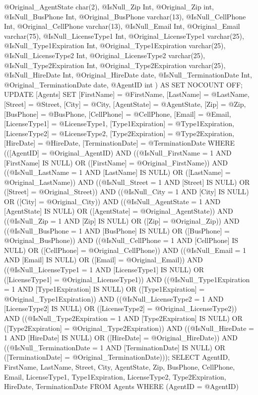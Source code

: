 	@Original_AgentState char(2),
	@IsNull_Zip Int,
	@Original_Zip int,
	@IsNull_BusPhone Int,
	@Original_BusPhone varchar(13),
	@IsNull_CellPhone Int,
	@Original_CellPhone varchar(13),
	@IsNull_Email Int,
	@Original_Email varchar(75),
	@IsNull_LicenseType1 Int,
	@Original_LicenseType1 varchar(25),
	@IsNull_Type1Expiration Int,
	@Original_Type1Expiration varchar(25),
	@IsNull_LicenseType2 Int,
	@Original_LicenseType2 varchar(25),
	@IsNull_Type2Expiration Int,
	@Original_Type2Expiration varchar(25),
	@IsNull_HireDate Int,
	@Original_HireDate date,
	@IsNull_TerminationDate Int,
	@Original_TerminationDate date,
	@AgentID int
) AS SET NOCOUNT OFF;
UPDATE [Agents] SET [FirstName] = @FirstName, [LastName] = @LastName, [Street] = @Street, [City] = @City, [AgentState] = @AgentState, [Zip] = @Zip, [BusPhone] = @BusPhone, [CellPhone] = @CellPhone, [Email] = @Email, [LicenseType1] = @LicenseType1, [Type1Expiration] = @Type1Expiration, [LicenseType2] = @LicenseType2, [Type2Expiration] = @Type2Expiration, [HireDate] = @HireDate, [TerminationDate] = @TerminationDate WHERE (([AgentID] = @Original_AgentID) AND ((@IsNull_FirstName = 1 AND [FirstName] IS NULL) OR ([FirstName] = @Original_FirstName)) AND ((@IsNull_LastName = 1 AND [LastName] IS NULL) OR ([LastName] = @Original_LastName)) AND ((@IsNull_Street = 1 AND [Street] IS NULL) OR ([Street] = @Original_Street)) AND ((@IsNull_City = 1 AND [City] IS NULL) OR ([City] = @Original_City)) AND ((@IsNull_AgentState = 1 AND [AgentState] IS NULL) OR ([AgentState] = @Original_AgentState)) AND ((@IsNull_Zip = 1 AND [Zip] IS NULL) OR ([Zip] = @Original_Zip)) AND ((@IsNull_BusPhone = 1 AND [BusPhone] IS NULL) OR ([BusPhone] = @Original_BusPhone)) AND ((@IsNull_CellPhone = 1 AND [CellPhone] IS NULL) OR ([CellPhone] = @Original_CellPhone)) AND ((@IsNull_Email = 1 AND [Email] IS NULL) OR ([Email] = @Original_Email)) AND ((@IsNull_LicenseType1 = 1 AND [LicenseType1] IS NULL) OR ([LicenseType1] = @Original_LicenseType1)) AND ((@IsNull_Type1Expiration = 1 AND [Type1Expiration] IS NULL) OR ([Type1Expiration] = @Original_Type1Expiration)) AND ((@IsNull_LicenseType2 = 1 AND [LicenseType2] IS NULL) OR ([LicenseType2] = @Original_LicenseType2)) AND ((@IsNull_Type2Expiration = 1 AND [Type2Expiration] IS NULL) OR ([Type2Expiration] = @Original_Type2Expiration)) AND ((@IsNull_HireDate = 1 AND [HireDate] IS NULL) OR ([HireDate] = @Original_HireDate)) AND ((@IsNull_TerminationDate = 1 AND [TerminationDate] IS NULL) OR ([TerminationDate] = @Original_TerminationDate)));
SELECT AgentID, FirstName, LastName, Street, City, AgentState, Zip, BusPhone, CellPhone, Email, LicenseType1, Type1Expiration, LicenseType2, Type2Expiration, HireDate, TerminationDate FROM Agents WHERE (AgentID = @AgentID)
